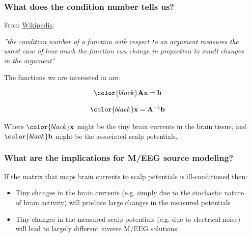 \documentclass[compress]{beamer}
\newcommand{\black}[1]{{\color{black}#1}}
\newcommand{\beq}[1]{\[\black{#1}\]}
\begin{document}
\begin{frame}[fragile]
\frametitle{What does the condition number tells us?}

From \black{\href{http://en.wikipedia.org/wiki/Condition\_number}{Wikipedia}}:

\vspace{.3cm}

\textit{\small{''the condition number of a function with respect to an argument measures the worst case of how much the function can change in proportion to small changes in the argument"}} 


\vspace{.2cm}
The functions we are interested in are:

\beq{
\A\x = \b
}

\beq{
\x = \A^{-1}\b
}

Where $\black{\x}$ might be the tiny brain currents in the brain tissue, and $\black{\b}$ might be the associated scalp potentials.

\end{frame}

\begin{frame}[fragile]
\frametitle{What are the implications for M/EEG source modeling?}

If the matrix that maps brain currents to scalp potentials is ill-conditioned then:

\vspace{.4cm}

\begin{itemize}

\item \black{Tiny changes in the brain currents (e.g. simply due to the stochastic nature of brain activity) will produce large changes in the measured potentials}

\vspace{.2cm}

\item \black{Tiny changes in the measured scalp potentials (e.g. due to electrical noise) will lead to largely different inverse M/EEG solutions}

\end{itemize}

\end{frame}
\end{document}
